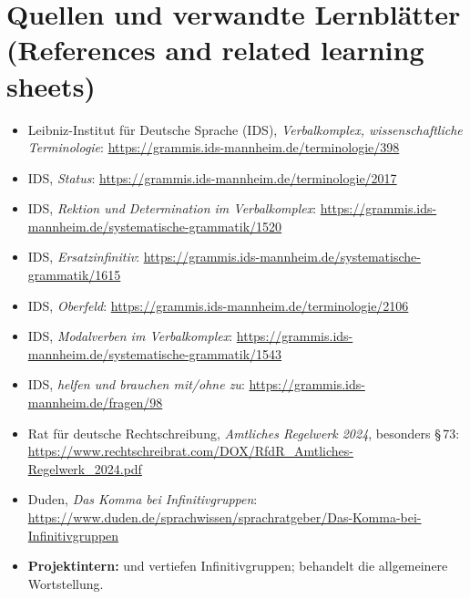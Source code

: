 \documentclass[a4paper,11pt]{article}
\begin{document}
\section{Quellen und verwandte Lernblätter \textnormal{(References and related learning sheets)}}
\begin{itemize}
\item Leibniz-Institut für Deutsche Sprache (IDS), \textit{Verbalkomplex, wissenschaftliche Terminologie}: \url{https://grammis.ids-mannheim.de/terminologie/398}
\item IDS, \textit{Status}: \url{https://grammis.ids-mannheim.de/terminologie/2017}
\item IDS, \textit{Rektion und Determination im Verbalkomplex}: \url{https://grammis.ids-mannheim.de/systematische-grammatik/1520}
\item IDS, \textit{Ersatzinfinitiv}: \url{https://grammis.ids-mannheim.de/systematische-grammatik/1615}
\item IDS, \textit{Oberfeld}: \url{https://grammis.ids-mannheim.de/terminologie/2106}
\item IDS, \textit{Modalverben im Verbalkomplex}: \url{https://grammis.ids-mannheim.de/systematische-grammatik/1543}
\item IDS, \textit{helfen und brauchen mit/ohne zu}: \url{https://grammis.ids-mannheim.de/fragen/98}
\item Rat für deutsche Rechtschreibung, \textit{Amtliches Regelwerk 2024}, besonders §\,73: \url{https://www.rechtschreibrat.com/DOX/RfdR_Amtliches-Regelwerk_2024.pdf}
\item Duden, \textit{Das Komma bei Infinitivgruppen}: \url{https://www.duden.de/sprachwissen/sprachratgeber/Das-Komma-bei-Infinitivgruppen}
\item \textbf{Projektintern:}  und  vertiefen Infinitivgruppen;  behandelt die allgemeinere Wortstellung.
\end{itemize}
\end{document}
